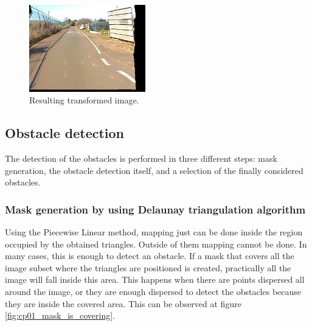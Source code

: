 \begin{figure}[h!]
\centering
\includegraphics[width=0.45\textwidth]{transformed}
\caption{Resulting transformed image.}\label{fig:cp01_transform_and_resample}
\end{figure}

\subsection{Obstacle detection}\label{ch:chapter01_01_03}

The detection of the obstacles is performed in three different steps: mask generation, the obstacle detection itself, and a selection of the finally considered obstacles.

\subsubsection{Mask generation by using Delaunay triangulation algorithm}\label{ch:chapter01_01_03_01}

Using the Piecewise Linear method, mapping just can be done inside the region occupied by the obtained triangles. Outside of them mapping cannot be done. In many cases, this is enough to detect an obstacle. If a mask that covers all the image subset where the triangles are positioned is created, practically all the image will fall inside this area. This happens when there are points dispersed all around the image, or they are enough dispersed to detect the obstacles because they are inside the covered area. This can be observed at figure \ref{fig:cp01_mask_is_covering}.

